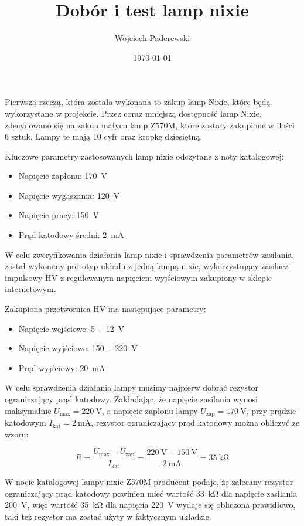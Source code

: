 \documentclass[../main.tex]{subfiles}
\author{Wojciech Paderewski}
\date{\today}
\title{Dobór i test lamp nixie}
\begin{document}
Pierwszą rzeczą, która została wykonana to zakup lamp Nixie, które będą wykorzystane w projekcie. 
Przez coraz mniejszą dostępność lamp Nixie,
zdecydowano się na zakup małych lamp Z570M, które zostały zakupione w ilości 6 sztuk. Lampy te mają 10 cyfr oraz kropkę dziesiętną.

Kluczowe parametry zastosowanych lamp nixie odczytane z noty katalogowej:
\begin{itemize}
    \item Napięcie zapłonu: \SI{170}{\volt}
    \item Napięcie wygaszania: \SI{120}{\volt}
    \item Napięcie pracy: \SI{150}{\volt}
    \item Prąd katodowy średni: \SI{2}{\milli\ampere}
\end{itemize}

W celu zweryfikowania działania lamp nixie i sprawdzenia parametrów zasilania, został wykonany prototyp układu z jedną lampą nixie,
wykorzystujący zasilacz impulsowy HV z regulowanym napięciem wyjściowym zakupiony w sklepie internetowym.

Zakupiona przetwornica HV ma następujące parametry:
\begin{itemize}
    \item Napięcie wejściowe: \SI{5}-\SI{12}{\volt}
    \item Napięcie wyjściowe: \SI{150}-\SI{220}{\volt}
    \item Prąd wyjściowy: \SI{20}{\milli\ampere}
\end{itemize}

W celu sprawdzenia działania lampy musimy najpierw dobrać rezystor ograniczający prąd katodowy.
Zakładając, że napięcie zasilania wynosi maksymalnie $U_{\text{max}} = \SI{220}{\volt}$, a napięcie zapłonu lampy $U_{\text{zap}} = \SI{170}{\volt}$,
przy prądzie katodowym $I_{\text{kat}} = \SI{2}{\milli\ampere}$, rezystor ograniczający prąd katodowy można obliczyć ze wzoru:

\begin{equation}
    R = \frac{U_{\text{max}} - U_{\text{zap}}}{I_{\text{kat}}} = \frac{\SI{220}{\volt} - \SI{150}{\volt}}{\SI{2}{\milli\ampere}} = \SI{35}{\kilo\ohm}
\end{equation}

W nocie katalogowej lampy nixie Z570M producent podaje, że zalecany rezystor ograniczający prąd katodowy 
powinien mieć wartość \SI{33}{\kilo\ohm} dla napięcie zasilania \SI{200}{\volt}, więc wartość \SI{35}{\kilo\ohm} dla napięcia \SI{220}{\volt}
wydaje się obliczona prawidłowo, taki też rezystor ma zostać użyty w faktycznym układzie.
\end{document}
